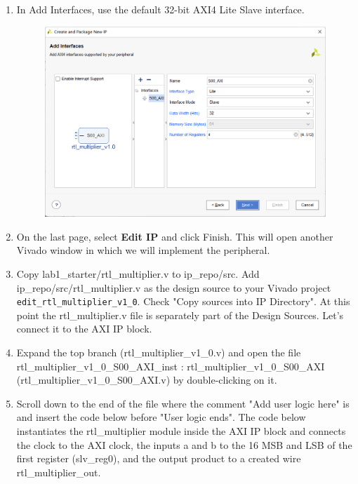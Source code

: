 \documentclass[a4paper,12pt,twoside]{article}
\begin{document}
\begin{enumerate}
\begin{figure}[H]
    \end{figure}
    \item In Add Interfaces, use the default 32-bit AXI4 Lite Slave interface.
    \begin{figure}[H]
        \centering
        \includegraphics[width=\textwidth]{images/24.png}
    \end{figure}
    \item On the last page, select \textbf{Edit IP} and click Finish. This will open another Vivado window in which we will implement the peripheral.
    \item Copy lab1\_starter/rtl\_multiplier.v to ip\_repo/src. Add ip\_repo/src/rtl\_multiplier.v as the design source to your Vivado project \texttt{edit\_rtl\_multiplier\_v1\_0}. Check "Copy sources into IP Directory". At this point the rtl\_multiplier.v file is separately part of the Design Sources. Let's connect it to the AXI IP block.
    \item Expand the top branch (rtl\_multiplier\_v1\_0.v) and open the file\\
    rtl\_multiplier\_v1\_0\_S00\_AXI\_inst : rtl\_multiplier\_v1\_0\_S00\_AXI\\
    (rtl\_multiplier\_v1\_0\_S00\_AXI.v) by double-clicking on it.
    \item Scroll down to the end of the file where the comment "Add user logic here" is and insert the code below before "User logic ends". The code below instantiates the rtl\_multiplier module inside the AXI IP block and connects the clock to the AXI clock, the inputs a and b to the 16 MSB and LSB of the first register (slv\_reg0), and the output product to a created wire rtl\_multiplier\_out.
    \begin{verbatim}

\end{verbatim}
\end{enumerate}
\end{document}
